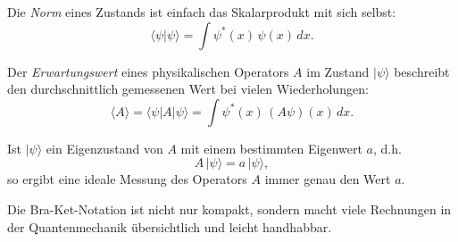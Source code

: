 Die \emph{Norm} eines Zustands ist einfach das Skalarprodukt mit sich selbst:
\begin{equation}
  \langle \psi | \psi \rangle = \int \psi^*(x)\,\psi(x)\,dx.
\end{equation}

Der \emph{Erwartungswert} eines physikalischen Operators $A$ im Zustand $|\psi\rangle$ beschreibt den durchschnittlich gemessenen Wert bei vielen Wiederholungen:
\begin{equation}
  \langle A \rangle = \langle \psi | A | \psi \rangle = \int \psi^*(x)\,(A\psi)(x)\,dx.
\end{equation}

Ist $|\psi\rangle$ ein Eigenzustand von $A$ mit einem bestimmten Eigenwert $a$, d.h.
\begin{equation}
  A\,|\psi\rangle = a\,|\psi\rangle,
\end{equation}
so ergibt eine ideale Messung des Operators $A$ immer genau den Wert $a$.

Die Bra-Ket-Notation ist nicht nur kompakt, sondern macht viele Rechnungen in der Quantenmechanik übersichtlich und leicht handhabbar.

